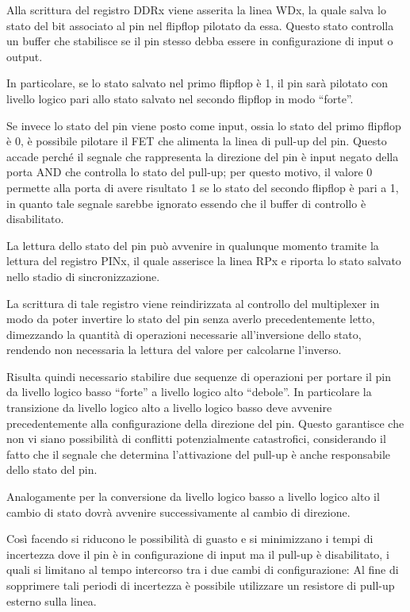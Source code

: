 Alla scrittura del registro DDRx viene asserita la linea WDx, la quale salva lo stato del bit associato al pin nel flipflop pilotato da essa. Questo stato controlla un buffer che stabilisce se il pin stesso debba essere in configurazione di input o output.

In particolare, se lo stato salvato nel primo flipflop è 1, il pin sarà pilotato con livello logico pari allo stato salvato nel secondo flipflop in modo ``forte''.

Se invece lo stato del pin viene posto come input, ossia lo stato del primo flipflop è 0, è possibile pilotare il FET che alimenta la linea di pull-up del pin. Questo accade perché il segnale che rappresenta la direzione del pin è input negato della porta AND che controlla lo stato del pull-up; per questo motivo, il valore 0 permette alla porta di avere risultato 1 se lo stato del secondo flipflop è pari a 1, in quanto tale segnale sarebbe ignorato essendo che il buffer di controllo è disabilitato.

La lettura dello stato del pin può avvenire in qualunque momento tramite la lettura del registro PINx, il quale asserisce la linea RPx e riporta lo stato salvato nello stadio di sincronizzazione.

La scrittura di tale registro viene reindirizzata al controllo del multiplexer in modo da poter invertire lo stato del pin senza averlo precedentemente letto, dimezzando la quantità di operazioni necessarie all'inversione dello stato, rendendo non necessaria la lettura del valore per calcolarne l'inverso.

Risulta quindi necessario stabilire due sequenze di operazioni per portare il pin da livello logico basso ``forte'' a livello logico alto ``debole''. In particolare la transizione da livello logico alto a livello logico basso deve avvenire precedentemente alla configurazione della direzione del pin. Questo garantisce che non vi siano possibilità di conflitti potenzialmente catastrofici, considerando il fatto che il segnale che determina l'attivazione del pull-up è anche responsabile dello stato del pin.

Analogamente per la conversione da livello logico basso a livello logico alto il cambio di stato dovrà avvenire successivamente al cambio di direzione.

Così facendo si riducono le possibilità di guasto e si minimizzano i tempi di incertezza dove il pin è in configurazione di input ma il pull-up è disabilitato, i quali si limitano al tempo intercorso tra i due cambi di configurazione: Al fine di sopprimere tali periodi di incertezza è possibile utilizzare un resistore di pull-up esterno sulla linea.

